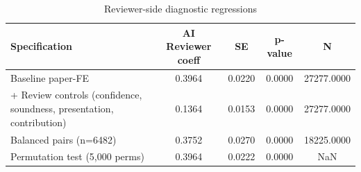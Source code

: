 \begin{table}
\caption{Reviewer-side diagnostic regressions}
\label{tab:reviewer_diagnostics}
\begin{tabular}{lcccc}
\toprule
Specification & AI Reviewer coeff & SE & p-value & N \\
\midrule
Baseline paper-FE & 0.3964 & 0.0220 & 0.0000 & 27277.0000 \\
+ Review controls (confidence, soundness, presentation, contribution) & 0.1364 & 0.0153 & 0.0000 & 27277.0000 \\
Balanced pairs (n=6482) & 0.3752 & 0.0270 & 0.0000 & 18225.0000 \\
Permutation test (5,000 perms) & 0.3964 & 0.0222 & 0.0000 & NaN \\
\bottomrule
\end{tabular}
\end{table}
